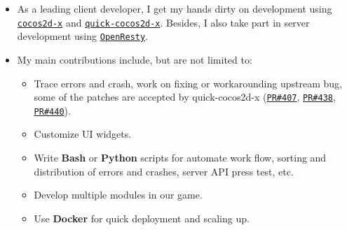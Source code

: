 \documentclass[letterpaper]{article}
\begin{document}
\begin{itemize}
\begin{itemize}
                \href{https://itunes.apple.com/us/app/ye-ye-san-guo/id976517523?mt=8}{\tt App Store}).
            \item As a leading client developer, I get my hands dirty on development using \href{http://cocos2d-x.org/}{\tt cocos2d-x} and \href{https://github.com/dualface/v3quick}{\tt quick-cocos2d-x}. Besides, I also take part in server development using \href{https://github.com/openresty/openresty}{\tt OpenResty}.
            \item My main contributions include, but are not limited to:
                \begin{itemize}
                    \item Trace errors and crash, work on fixing or workarounding upstream bug, some of the patches are accepted by quick-cocos2d-x (\href{https://github.com/dualface/v3quick/pull/407}{\tt PR\#407}, \href{https://github.com/dualface/v3quick/pull/438}{\tt PR\#438}, \href{https://github.com/dualface/v3quick/pull/440}{\tt PR\#440}).
                    \item Customize UI widgets.
                    \item Write \textbf{Bash} or \textbf{Python} scripts for automate work flow, sorting and distribution of errors and crashes, server API press test, etc.
                    \item Develop multiple modules in our game.
                    \item Use \textbf{Docker} for quick deployment and scaling up.
                \end{itemize}
        \end{itemize}
\end{itemize}

\end{document}
